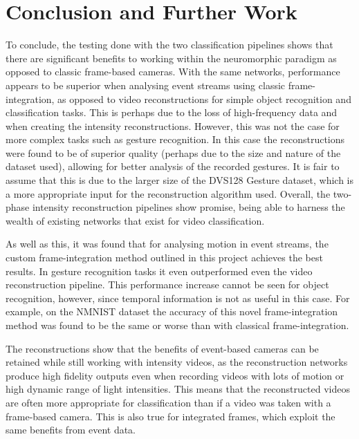 \chapter{Conclusion and Further Work} \label{chap:conclusion_and_further_work}

To conclude, the testing done with the two classification pipelines shows that there are significant benefits to working within the neuromorphic paradigm as opposed to classic frame-based cameras. With the same networks, performance appears to be superior when analysing event streams using classic frame-integration, as opposed to video reconstructions for simple object recognition and classification tasks. This is perhaps due to the loss of high-frequency data and when creating the intensity reconstructions. However, this was not the case for more complex tasks such as gesture recognition. In this case the reconstructions were found to be of superior quality (perhaps due to the size and nature of the dataset used), allowing for better analysis of the recorded gestures. It is fair to assume that this is due to the larger size of the DVS128 Gesture dataset, which is a more appropriate input for the reconstruction algorithm used. Overall, the two-phase intensity reconstruction pipelines show promise, being able to harness the wealth of existing networks that exist for video classification. 

As well as this, it was found that for analysing motion in event streams, the custom frame-integration method outlined in this project achieves the best results. In gesture recognition tasks it even outperformed even the video reconstruction pipeline. This performance increase cannot be seen for object recognition, however, since temporal information is not as useful in this case. For example, on the NMNIST dataset the accuracy of this novel frame-integration method was found to be the same or worse than with classical frame-integration.

The reconstructions show that the benefits of event-based cameras can be retained while still working with intensity videos, as the reconstruction networks produce high fidelity outputs even when recording videos with lots of motion or high dynamic range of light intensities. This means that the reconstructed videos are often more appropriate for classification than if a video was taken with a frame-based camera. This is also true for integrated frames, which exploit the same benefits from event data.

